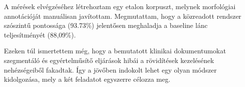 A mérések elvégzéséhez létrehoztam egy etalon korpuszt, melynek morfológiai annotációját manuálisan javítottam. 
Megmutattam, hogy a közreadott rendszer szószintű pontossága (93.73\%) jelentősen meghaladja a baseline lánc teljesítményét (88,09\%). 

Ezeken túl ismertettem még, hogy a bemutatott klinikai dokumentumokat szegmentáló és egyértelműsítő eljárások hibái a rövidítések kezelésének nehézségeiből fakadtak.
Így a jövőben indokolt lehet egy olyan módszer kidolgozása, mely a két feladatot egyszerre célozza meg.

\let\thesubsection=\oldthesubsection
